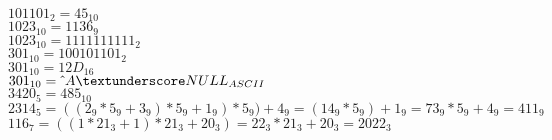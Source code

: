 \documentclass{article}
\begin{document}
\noindent $101101_2 = 45_{10} $\\
$1023_{10} = 1136_9 $\\
$1023_{10} = 1111111111_2$\\
$301_{10} = 100101101_2$\\
$301_{10} = 12D_{16}$\\
$301_{10} = \hat{\mkern6mu} A\textunderscore NULL_{ASCII}$\\
$3420_5 = 485_{10}$\\
$2314_5 = ((2_9 * 5_9 + 3_9) * 5_9 + 1_9) * 5_9) + 4_9 = (14_9 * 5_9) + 1_9 = 73_9 * 5_9 + 4_9 =  411_9$\\
$116_7 = ((1 * 21_3 + 1)* 21_3 + 20_3) = 22_3 * 21_3 + 20_3 = 2022_3  $
\end{document}
